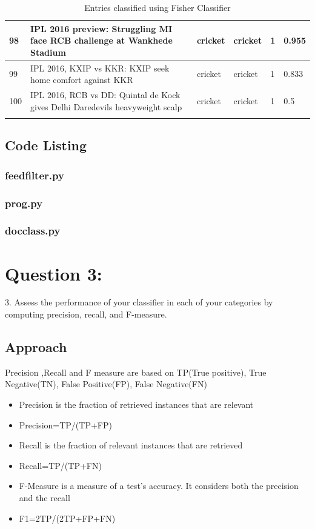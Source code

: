 \documentclass[12pt]{article}
\begin{document}
\begin{longtable}{|p{2.0cm} | p{6.0cm} | p{2.0cm} |p{2.0cm}| p{2.0cm}|p{2.0cm}|}
98 & IPL 2016 preview: Struggling MI face RCB challenge at Wankhede Stadium & cricket & cricket & 1 & 0.955 \\\hline													
99 & IPL 2016, KXIP vs KKR: KXIP seek home comfort against KKR & cricket & cricket & 1 & 0.833 \\\hline													
100 & IPL 2016, RCB vs DD: Quintal de Kock gives Delhi Daredevils heavyweight scalp & cricket & cricket & 1 & 0.5 \\\hline													
 \caption{Entries classified using Fisher Classifier}
\end{longtable}



\subsection{Code Listing}
\subsubsection{feedfilter.py}

\newpage

\subsubsection{prog.py}

\subsubsection{docclass.py}









\section{Question 3: }
3.  Assess the performance of your classifier in each of your
categories by computing precision, recall, and F-measure.  
\subsection{Approach}
Precision ,Recall and F measure are based on TP(True positive), True Negative(TN), False Positive(FP), False Negative(FN)


\begin{itemize}
\item Precision  is the fraction of retrieved instances that are relevant
\item Precision=TP/(TP+FP)
\item Recall  is the fraction of relevant instances that are retrieved
\item Recall=TP/(TP+FN)
\item F-Measure  is a measure of a test's accuracy. It considers both the precision  and the recall 
\item F1=2TP/(2TP+FP+FN)

\end{itemize}
\end{document}
